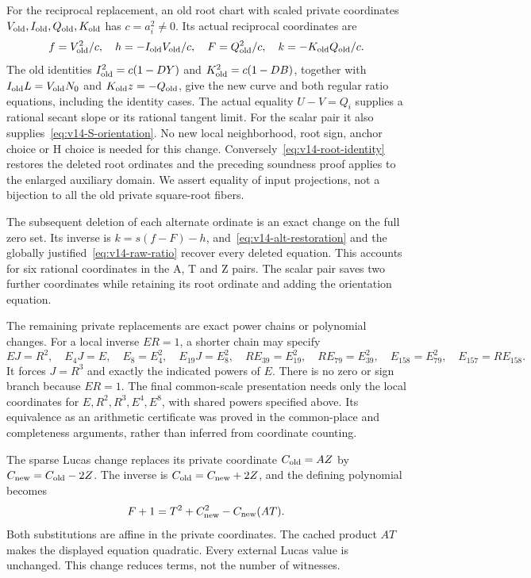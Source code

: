 For the reciprocal replacement, an old root chart with
scaled private coordinates $V_{\rm old},I_{\rm old},
Q_{\rm old},K_{\rm old}$ has $c=a_i^2\ne0$.
Its actual reciprocal coordinates are
\[
 f=V_{\rm old}^2/c,\quad
 h=-I_{\rm old}V_{\rm old}/c,\quad
 F=Q_{\rm old}^2/c,\quad
 k=-K_{\rm old}Q_{\rm old}/c.
\]
The old identities $I_{\rm old}^2=c(1-DY)$ and
$K_{\rm old}^2=c(1-DB)$, together with
$I_{\rm old}L=V_{\rm old}N_0$ and
$K_{\rm old}z=-Q_{\rm old}$, give the new curve and both
regular ratio equations, including the identity cases.
The actual equality $U-V=Q_i$ supplies a rational secant
slope or its rational tangent limit. For the scalar pair it
also supplies~\eqref{eq:v14-S-orientation}.
No new local neighborhood, root sign, anchor choice or H
choice is needed for this change.
Conversely~\eqref{eq:v14-root-identity} restores the deleted
root ordinates and the preceding soundness proof applies to
the enlarged auxiliary domain. We assert equality of input
projections, not a bijection to all the old private
square-root fibers.

The subsequent deletion of each alternate ordinate is an
exact change on the full zero set. Its inverse is
$k=s(f-F)-h$, and~\eqref{eq:v14-alt-restoration} and the
globally justified~\eqref{eq:v14-raw-ratio} recover every
deleted equation. This accounts for six rational coordinates
in the A, T and Z pairs. The scalar pair saves two further
coordinates while retaining its root ordinate and adding
the orientation equation.

The remaining private replacements are exact power chains
or polynomial changes. For a local inverse $ER=1$, a shorter
chain may specify
\[
 EJ=R^2,\quad E_4J=E,\quad E_8=E_4^2,\quad
 E_{19}J=E_8^2,\quad RE_{39}=E_{19}^2,\quad
 RE_{79}=E_{39}^2,\quad
 E_{158}=E_{79}^2,\quad E_{157}=RE_{158}.
\]
It forces $J=R^3$ and exactly the indicated powers of $E$.
There is no zero or sign branch because $ER=1$.
The final common-scale presentation needs only the local
coordinates for $E,R^2,R^3,E^4,E^8$, with shared powers
specified above. Its equivalence as an arithmetic
certificate was proved in the common-place and completeness
arguments, rather than inferred from coordinate counting.

The sparse Lucas change replaces its private coordinate
$C_{\rm old}=AZ$ by $C_{\rm new}=C_{\rm old}-2Z$.
The inverse is $C_{\rm old}=C_{\rm new}+2Z$, and the defining
polynomial becomes
\[
 F+1=T^2+C_{\rm new}^2-C_{\rm new}(AT).
\]
Both substitutions are affine in the private coordinates.
The cached product $AT$ makes the displayed equation
quadratic. Every external Lucas value is unchanged.
This change reduces terms, not the number of witnesses.

